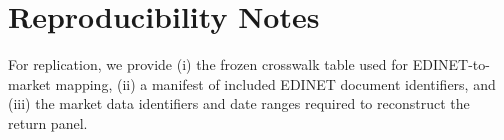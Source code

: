 \section{Reproducibility Notes}
\label{appendix:market_reproducibility}

For replication, we provide (i) the frozen crosswalk table used for EDINET-to-market mapping, (ii) a manifest of included EDINET document identifiers, and (iii) the market data identifiers and date ranges required to reconstruct the return panel.
